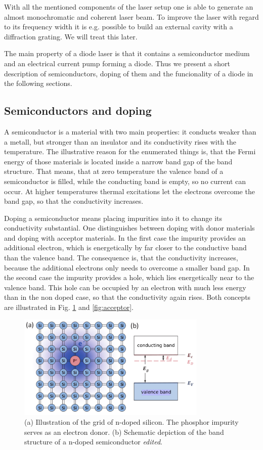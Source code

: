 With all the mentioned components of the laser setup one is able to generate an almost monochromatic and coherent laser beam.
To improve the laser with regard to its frequency width it is e.g. possible to build an external cavity with a diffraction
grating. We will treat this later.

The main property of a diode laser is that it contains a semiconductor medium and an electrical current pump forming a diode.
Thus we present a short description of semiconductors, doping of them and the funcionality of a diode in the following sections.

\subsection{Semiconductors and doping}

A semiconductor is a material with two main properties: it conducts weaker than a metall, but stronger than an insulator and
its conductivity rises with the temperature. The illustrative reason for the enumerated things is, that the Fermi energy of
those materials is located inside a narrow band gap of the band structure. That means, that at zero temperature the valence band of a semiconductor is
filled, while the conducting band is empty, so no current can occur. At higher temperatures thermal excitations let the electrons overcome
the band gap, so that the conductivity increases.

Doping a semiconductor means placing impurities into it to change its conductivity substantial.
One distinguishes between doping with donor materials and doping with acceptor materials.
In the first case the impurity provides an additional electron, which is energetically by far closer to the
conductive band than the valence band. The consequence is, that the conductivity increases, because
the additional electrons only needs to overcome a smaller band gap. In the second case the impurity
provides a hole, which lies energetically near to the valence band. This hole can be occupied by an electron
with much less energy than in the non doped case, so that the conductivity again rises.
Both concepts are illustrated in Fig. \ref{fig:donor} and \ref{fig:acceptor}.

\begin{figure}
  \centering
  \includegraphics[height=5cm]{Ordnername/donor_edit.pdf}
  \caption{(a) Illustration of the grid of n-doped silicon. The phosphor impurity serves as an electron donor.
  (b) Schematic depiction of the band structure of a n-doped semiconductor \cite{semiconductors} \textit{edited}.}
  \label{fig:donor}
\end{figure}

